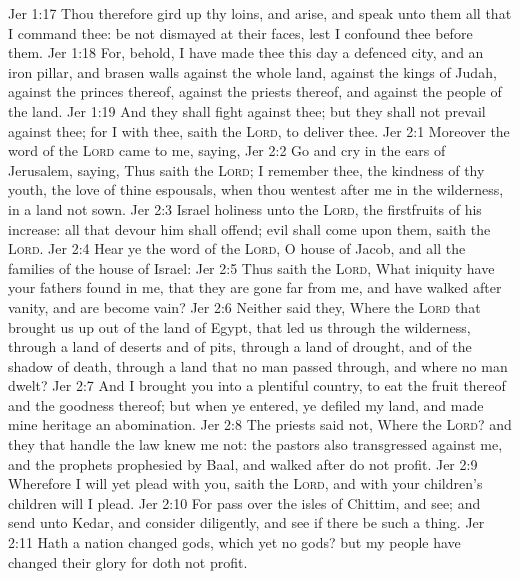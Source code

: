 \vs Jer 1:17 Thou therefore gird up thy loins, and arise, and speak unto them all that I command thee: be not dismayed at their faces, lest I confound thee before them.
\vs Jer 1:18 For, behold, I have made thee this day a defenced city, and an iron pillar, and brasen walls against the whole land, against the kings of Judah, against the princes thereof, against the priests thereof, and against the people of the land.
\vs Jer 1:19 And they shall fight against thee; but they shall not prevail against thee; for I  with thee, saith the \textsc{Lord}, to deliver thee.
\vs Jer 2:1 Moreover the word of the \textsc{Lord} came to me, saying,
\vs Jer 2:2 Go and cry in the ears of Jerusalem, saying, Thus saith the \textsc{Lord}; I remember thee, the kindness of thy youth, the love of thine espousals, when thou wentest after me in the wilderness, in a land  not sown.
\vs Jer 2:3 Israel  holiness unto the \textsc{Lord},  the firstfruits of his increase: all that devour him shall offend; evil shall come upon them, saith the \textsc{Lord}.
\vs Jer 2:4 Hear ye the word of the \textsc{Lord}, O house of Jacob, and all the families of the house of Israel:
\vs Jer 2:5 Thus saith the \textsc{Lord}, What iniquity have your fathers found in me, that they are gone far from me, and have walked after vanity, and are become vain?
\vs Jer 2:6 Neither said they, Where  the \textsc{Lord} that brought us up out of the land of Egypt, that led us through the wilderness, through a land of deserts and of pits, through a land of drought, and of the shadow of death, through a land that no man passed through, and where no man dwelt?
\vs Jer 2:7 And I brought you into a plentiful country, to eat the fruit thereof and the goodness thereof; but when ye entered, ye defiled my land, and made mine heritage an abomination.
\vs Jer 2:8 The priests said not, Where  the \textsc{Lord}? and they that handle the law knew me not: the pastors also transgressed against me, and the prophets prophesied by Baal, and walked after  do not profit.
\vs Jer 2:9 Wherefore I will yet plead with you, saith the \textsc{Lord}, and with your children's children will I plead.
\vs Jer 2:10 For pass over the isles of Chittim, and see; and send unto Kedar, and consider diligently, and see if there be such a thing.
\vs Jer 2:11 Hath a nation changed  gods, which  yet no gods? but my people have changed their glory for  doth not profit.
